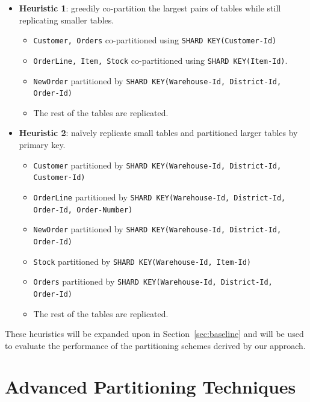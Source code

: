 \begin{itemize}
    \item \textbf{Heuristic 1}: greedily co-partition the largest pairs of tables while still replicating smaller tables.
    \begin{itemize}
        \item \texttt{Customer, Orders} co-partitioned using \texttt{SHARD KEY(Customer-Id)}
        \item \texttt{OrderLine, Item, Stock} co-partitioned using \texttt{SHARD KEY(Item-Id)}.
        \item \texttt{NewOrder} partitioned by \texttt{SHARD KEY(Warehouse-Id, District-Id, \\Order-Id)}        
        \item The rest of the tables are replicated.
    \end{itemize}
    \item \textbf{Heuristic 2}: naïvely replicate small tables and partitioned larger tables by primary key.
    \begin{itemize}
        \item \texttt{Customer} partitioned by \texttt{SHARD KEY(Warehouse-Id, District-Id, \\Customer-Id)}
        \item \texttt{OrderLine} partitioned by \texttt{SHARD KEY(Warehouse-Id, District-Id, \\Order-Id, Order-Number)}
        \item \texttt{NewOrder} partitioned by \texttt{SHARD KEY(Warehouse-Id, District-Id, \\Order-Id)}
        \item \texttt{Stock} partitioned by \texttt{SHARD KEY(Warehouse-Id, Item-Id)}
        \item \texttt{Orders} partitioned by \texttt{SHARD KEY(Warehouse-Id, District-Id, \\Order-Id)}
        \item The rest of the tables are replicated.
    \end{itemize}
\end{itemize}

These heuristics will be expanded upon in Section~\ref{sec:baseline} and will be used to evaluate the performance of the partitioning schemes derived by our approach. 

\section{Advanced Partitioning Techniques}
\label{sec:adv-part-techniques}
